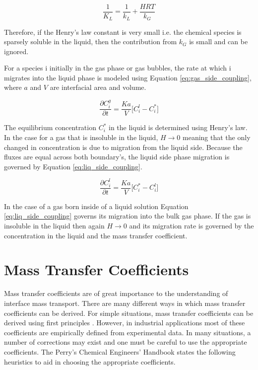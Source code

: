  \begin{equation}
	\frac{1}{K_{L}} = \frac{1}{k_{L}} + \frac{HRT}{k_{G}}
\end{equation}

Therefore, if the Henry's law constant is very small i.e. the chemical species is sparsely  soluble in the liquid, then the contribution from $k_{G}$ is small and can be ignored. 

For a species i initially in the gas phase or gas bubbles, the rate at which i migrates into the liquid phase is modeled using Equation \ref{eq:gas_side_coupling}, where $a$ and $V$ are interfacial area and volume.

\begin{equation}
    \frac{\partial C_{i}^{g}}{\partial t} = \frac{Ka}{V}\Big[C_{i}^{l}  - C_{i}^{*}\Big]
    \label{eq:gas_side_coupling}
\end{equation}

The equilibrium concentration $C_{i}^{*}$ in the liquid is determined using Henry's law. In the case for a gas that is insoluble in the liquid, $H \rightarrow 0$ meaning that the only changed in concentration is due to migration from the liquid side. Because the fluxes are equal across both boundary's, the liquid side phase migration is governed by Equation \ref{eq:liq_side_coupling}.

\begin{equation}
    \frac{\partial C_{i}^{l}}{\partial t} = \frac{Ka}{V}\Big[C_{i}^{*} - C_{i}^{l}\Big]
    \label{eq:liq_side_coupling}
\end{equation}

In the case of a gas born inside of a liquid solution Equation \ref{eq:liq_side_coupling} governs its migration into the bulk gas phase. If the gas is insoluble in the liquid then again $H \rightarrow 0$ and its migration rate is governed by the concentration in the liquid and the mass transfer coefficient. 


\section{Mass Transfer Coefficients}
Mass transfer coefficients are of great importance to the understanding of interface mass transport. There are many different ways in which mass transfer coefficients can be derived. For simple situations, mass transfer coefficients can be derived using first principles \cite{perry2007}. However, in industrial applications most of these coefficients are empirically defined from experimental data. In many situations, a number of corrections may exist and one must be careful to use the appropriate coefficients. The Perry's Chemical Engineers' Handbook \cite{perry2007} states the following heuristics to aid in choosing the appropriate coefficients.


